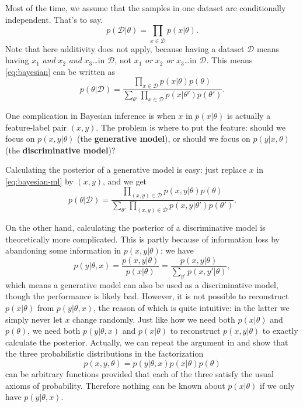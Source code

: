 \documentclass[hyperref, a4paper]{article}
\newcommand*{\concept}[1]{{\textbf{#1}}}
\begin{document}
Most of the time, we assume that the samples in one dataset are conditionally independent.
That's to say.
\begin{equation}
    p(\mathcal{D} | \theta) = \prod_{x \in \mathcal{D}} p(x | \theta).
\end{equation}
Note that here additivity does not apply,
because having a dataset $\mathcal{D}$ means 
having $x_1$ \emph{and} $x_2$ \emph{and} $x_3$\dots in $\mathcal{D}$,
not $x_1$ \emph{or} $x_2$ \emph{or} $x_3$\dots in $\mathcal{D}$.
This means \eqref{eq:bayesian} can be written as 
\begin{equation}
    p(\theta | \mathcal{D}) = \frac{
        \prod_{x \in \mathcal{D}} p(x | \theta) p(\theta)
    }{
        \sum_{\theta'} \prod_{x \in \mathcal{D}} p(x | \theta') p(\theta')
    }.
    \label{eq:bayesian-ml}
\end{equation}

One complication in Bayesian inference is when $x$ in $p(x | \theta)$ is actually a feature-label pair $(x, y)$.
The problem is where to put the feature: should we focus on $p(x, y | \theta)$ (the \concept{generative model}),
or should we focus on $p(y | x, \theta)$ (the \concept{discriminative model})?

Calculating the posterior of a generative model is easy:
just replace $x$ in \eqref{eq:bayesian-ml} by $(x, y)$, and we get 
\begin{equation}
    p(\theta | \mathcal{D}) = \frac{
        \prod_{(x, y) \in \mathcal{D}} p(x, y | \theta) p(\theta)
    }{
        \sum_{\theta'} \prod_{(x, y) \in \mathcal{D}} p(x, y | \theta') p(\theta')
    }.
    \label{eq:generative-bayesian}
\end{equation}

On the other hand, calculating the posterior of a discriminative model is theoretically more complicated.
This is partly because of information loss by abandoning some information in $p(x, y | \theta)$:
we have 
\begin{equation}
    p(y | \theta, x) = \frac{p(x, y | \theta)}{p(x | \theta)} = \frac{p(x, y | \theta)}{\sum_{y'} p(x, y' | \theta)},
\end{equation}
which means a generative model can also be used as a discriminative model,
though the performance is likely bad.
However, it is not possible to reconstruct $p(x | \theta)$ from $p(y | \theta, x)$,
the reason of which is quite intuitive:
in the latter we simply never let $x$ change randomly.
Just like how we need both $p(x | \theta)$ and $p(\theta)$,
we need both $p(y | \theta, x)$ and $p(x | \theta)$ to reconstruct $p(x, y | \theta)$ to exactly calculate the posterior.
Actually, we can repeat the argument in  and show that 
the three probabilistic distributions in the factorization 
\begin{equation}
    p(x, y, \theta) = p(y | \theta, x) p(x | \theta) p (\theta)
    \label{eq:theta-to-x-to-y}
\end{equation}
can be arbitrary functions provided that each of the three satisfy the usual axioms of probability.
Therefore nothing can be known about $p(x | \theta)$ if we only have $p(y | \theta, x)$.
\end{document}
